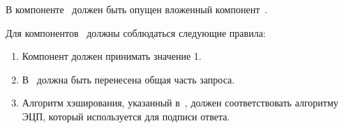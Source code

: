 В компоненте~ должен быть опущен вложенный
компонент~.
	
Для компонентов~ должны соблюдаться следующие правила:
\begin{enumerate}
\item
Компонент  должен принимать значение 1.
\item
В~ должна быть перенесена общая часть запроса. 
\item
Алгоритм хэширования, указанный в~,
должен соответствовать алгоритму ЭЦП, который используется для 
подписи ответа.
\end{enumerate}

